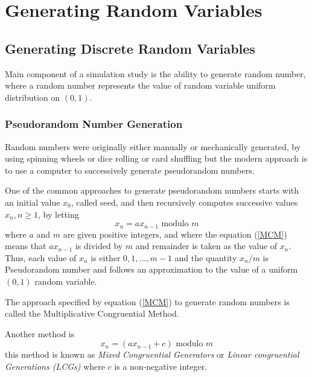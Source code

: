 \chapter{Generating Random Variables}

\section{Generating Discrete Random Variables}

Main component of a simulation study is the ability to generate random number, where a random number represents the value of random variable uniform
distribution on $(0,1)$.
\subsection{Pseudorandom Number Generation}
Random numbers were originally either manually or mechanically generated, by using spinning wheels or dice rolling or card shuffling
but the modern approach is to use a computer to successively generate pseudorandom numbers.

One of the common approaches to generate pseudorandom numbers starts with an initial value $x_0$, called seed, and then recursively computes
successive values $x_n, n\ge1$, by letting
\begin{equation}
	\label{MCM}
	x_n = a x_{n-1} \text{ modulo } m
\end{equation}
where $a$ and $m$ are given positive integers, and where the equation (\ref{MCM}) means that $ax_{n-1}$ is divided by  $m$ and remainder is taken as the
value of $x_n$. Thus, each value of $x_n$ is either $0,1, \ldots, m-1$ and the quantity $x_n / m$ is Pseudorandom number and follows
an approximation to the value of a uniform $(0,1)$ random variable.

The approach specified by equation (\ref{MCM}) to generate random numbers is called the Multiplicative Congruential Method.

Another method is
\[
	x_n = (a x_{n-1}+c) \text{ modulo } m
\]
this method is known as \textit{Mixed Congruential Generators} or \textit{Linear congruential Generations (LCGs)} where $c$ is a non-negative integer.

